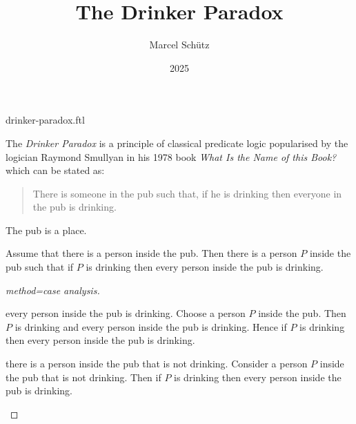 \documentclass{stex}
\title{The Drinker Paradox}
\author{Marcel Schütz}
\date{2025}
\begin{document}
\begin{smodule}{drinker-paradox.ftl}



\maketitle

\noindent The \emph{Drinker Paradox} is a principle of classical predicate 
logic popularised by the logician Raymond Smullyan in his 1978 book
\textit{What Is the Name of this Book?} \cite{Smullyan1978} which can be 
stated as:

\begin{quotation}
  \noindent There is someone in the pub such that, if he is drinking then 
  everyone in the pub is drinking.
\end{quotation}

\begin{forthel}

  \begin{signature*}
    The pub is a place.
  \end{signature*}
  
  \begin{theorem*}[title=Drinker Paradox,name=Drinker Paradox]
    Assume that there is a person inside the pub.
    Then there is a person $P$ inside the pub such that if $P$ is drinking then every person inside the pub is drinking.
  \end{theorem*}
  \begin{proof}[method=case analysis]
    \begin{case}{every person inside the pub is drinking.}
      Choose a person $P$ inside the pub.
      Then $P$ is drinking and every person inside the pub is drinking.
      Hence if $P$ is drinking then every person inside the pub is drinking.
    \end{case}
  
    \begin{case}{there is a person inside the pub that is not drinking.}
      Consider a person $P$ inside the pub that is not drinking.
      Then if $P$ is drinking then every person inside the pub is drinking.
    \end{case}
  \end{proof}
\end{forthel}

\printbibliography
{}

\end{smodule}
\end{document}
